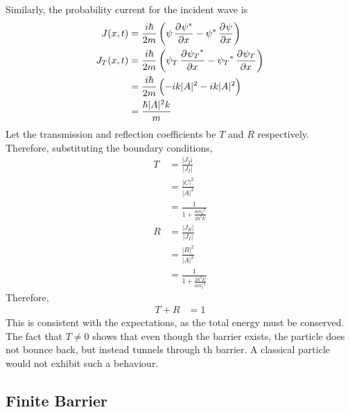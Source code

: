 \documentclass[titlepage, fleqn, a4paper, 12pt, twoside]{article}
\theoremstyle{definition}
\theoremstyle{theorem}
\begin{document}
Similarly, the probability current for the incident wave is
\begin{align*}
	J(x,t) &= \frac{i \hbar}{2 m} \left( \psi \dpd{\psi^*}{x} - \psi^* \dpd{\psi}{x} \right)\\
	J_T(x,t) &= \frac{i \hbar}{2 m} \left( \psi_T \dpd{{\psi_T}^*}{x} - {\psi_T}^* \dpd{\psi_T}{x} \right)\\
	&= \frac{i \hbar}{2 m} \left( -i k |A|^2 - i k |A|^2 \right)\\
	&= \frac{\hbar |A|^2 k}{m}
\end{align*}
Let the transmission and reflection coefficients be $T$ and $R$ respectively.
Therefore, substituting the boundary conditions,
\begin{align*}
	T &= \frac{|J_T|}{|J_I|}\\
	&= \frac{|C|^2}{|A|^2}\\
	&= \frac{1}{1 + \frac{m {V_0}^2}{2 \hbar^2 E}}\\
	R &= \frac{|J_R|}{|J_I|}\\
	&= \frac{|B|^2}{|A|^2}\\
	&= \frac{1}{1 + \frac{2 \hbar^2 E}{m {V_0}^2}}
\end{align*}
Therefore,
\begin{align*}
	T + R &= 1
\end{align*}
This is consistent with the expectations, as the total energy must be conserved.\\
The fact that $T \neq 0$ shows that even though the barrier exists, the particle does not bounce back, but instead tunnels through th barrier.
A classical particle would not exhibit such a behaviour.

\subsection{Finite Barrier}
\end{document}
